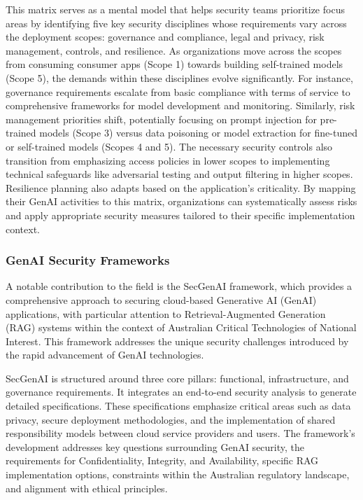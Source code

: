 This matrix serves as a mental model\cite{noauthor_securing_nodate} that helps security teams prioritize focus areas by identifying five key security disciplines whose requirements vary across the deployment scopes: governance and compliance, legal and privacy, risk management, controls, and resilience\cite{noauthor_securing_2023}\cite{noauthor_securing_nodate}. As organizations move across the scopes from consuming consumer apps (Scope 1) towards building self-trained models (Scope 5), the demands within these disciplines evolve significantly. For instance, governance requirements escalate from basic compliance with terms of service to comprehensive frameworks for model development and monitoring. Similarly, risk management priorities shift, potentially focusing on prompt injection for pre-trained models (Scope 3) versus data poisoning or model extraction for fine-tuned or self-trained models (Scopes 4 and 5). The necessary security controls also transition from emphasizing access policies in lower scopes to implementing technical safeguards like adversarial testing and output filtering in higher scopes. Resilience planning also adapts based on the application's criticality. By mapping their GenAI activities to this matrix, organizations can systematically assess risks and apply appropriate security measures tailored to their specific implementation context.

\subsubsection{GenAI Security Frameworks} %
\label{sec:GenAI Security Frameworks}

A notable contribution to the field is the SecGenAI framework, which provides a comprehensive approach to securing cloud-based Generative AI (GenAI) applications, with particular attention to Retrieval-Augmented Generation (RAG) systems within the context of Australian Critical Technologies of National Interest\cite{haryanto_secgenai_2024}. This framework addresses the unique security challenges introduced by the rapid advancement of GenAI technologies\cite{haryanto_secgenai_2024}.

SecGenAI is structured around three core pillars: functional, infrastructure, and governance requirements\cite{haryanto_secgenai_2024}. It integrates an end-to-end security analysis to generate detailed specifications. These specifications emphasize critical areas such as data privacy, secure deployment methodologies, and the implementation of shared responsibility models between cloud service providers and users\cite{haryanto_secgenai_2024}. The framework's development addresses key questions surrounding GenAI security, the requirements for Confidentiality, Integrity, and Availability, specific RAG implementation options, constraints within the Australian regulatory landscape, and alignment with ethical principles\cite{haryanto_secgenai_2024}.

